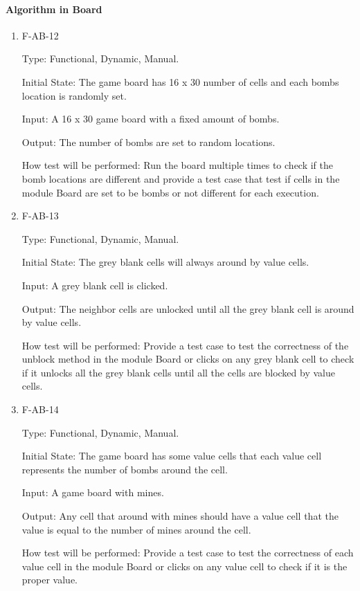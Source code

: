 \documentclass[12pt, titlepage]{article}
\begin{document}
\paragraph{Algorithm in Board}
\begin{enumerate}
\item{F-AB-12\\}

Type: Functional, Dynamic, Manual.
					
Initial State: The game board has 16 x 30 number of cells and each bombs location is randomly set.
					
Input: A 16 x 30 game board with a fixed amount of bombs.
					
Output: The number of bombs are set to random locations.
					
How test will be performed: Run the board multiple times to check if the bomb locations are different and provide a test case that test if cells in the module Board are set to be bombs or not different for each execution.

\item{F-AB-13\\}

Type: Functional, Dynamic, Manual.
					
Initial State: The grey blank cells will always around by value cells.
					
Input: A grey blank cell is clicked.
					
Output: The neighbor cells are unlocked until all the grey blank cell is around by value cells.
					
How test will be performed: Provide a test case to test the correctness of the unblock method in the module Board or clicks on any grey blank cell to check if it unlocks all the grey blank cells until all the cells are blocked by value cells.

\item{F-AB-14\\}

Type: Functional, Dynamic, Manual.
					
Initial State: The game board has some value cells that each value cell represents the number of bombs around the cell.
					
Input: A game board with mines.
					
Output: Any cell that around with mines should have a value cell that the value is equal to the number of mines around the cell.
					
How test will be performed: Provide a test case to test the correctness of each value cell in the module Board or clicks on any value cell to check if it is the proper value.


\end{enumerate}
\end{document}
